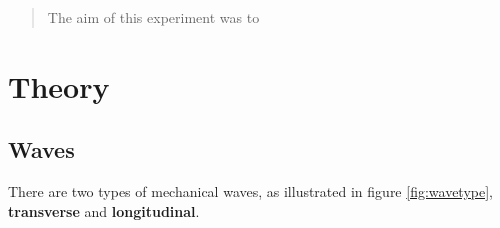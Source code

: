 \documentclass[12pt]{article}
\begin{document}
\setcounter{page}{1}
\tableofcontents

\newpage

\begin{abstract}

The aim of this experiment was to 

\end{abstract}


\section{Theory} \label{sec:1}


\subsection{Waves}

There are two types of mechanical waves, as illustrated in figure \ref{fig:wavetype}, \textbf{transverse} and \textbf{longitudinal}.
\end{document}

